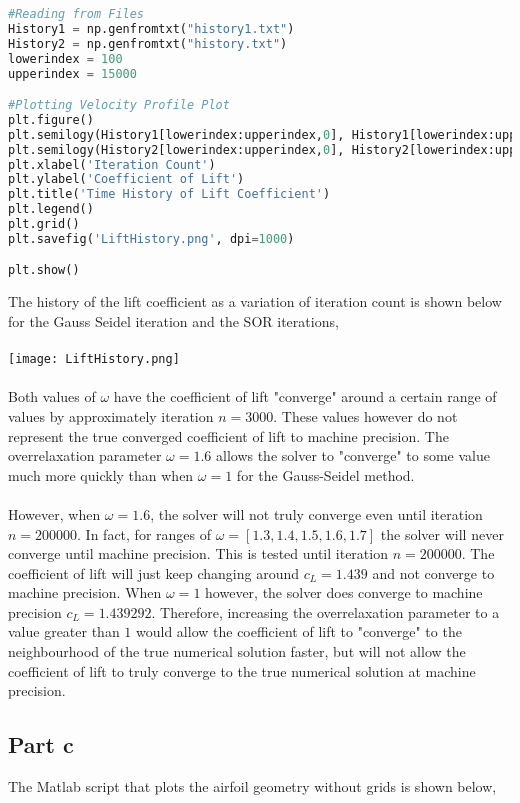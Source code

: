 \documentclass[a4paper, 12pt]{report}
\def\w{\omega}
\def\size{0.90}
\begin{document}
\begin{center}
\begin{lstlisting}[language=python]
#Reading from Files
History1 = np.genfromtxt("history1.txt")
History2 = np.genfromtxt("history.txt")
lowerindex = 100
upperindex = 15000

#Plotting Velocity Profile Plot
plt.figure()
plt.semilogy(History1[lowerindex:upperindex,0], History1[lowerindex:upperindex,1], label='w=1')
plt.semilogy(History2[lowerindex:upperindex,0], History2[lowerindex:upperindex,1], label='w=1.6')
plt.xlabel('Iteration Count')
plt.ylabel('Coefficient of Lift')
plt.title('Time History of Lift Coefficient')
plt.legend()
plt.grid()
plt.savefig('LiftHistory.png', dpi=1000)

plt.show()
\end{lstlisting}
$$$$
The history of the lift coefficient as a variation of iteration count is shown below for the Gauss Seidel iteration and the SOR iterations,
\\~\\\texttt{[image: LiftHistory.png]}
\\~\\Both values of $\w$ have the coefficient of lift "converge" around a certain range of values by approximately iteration $n=3000$. These values however do not represent the true converged coefficient of lift to machine precision. The overrelaxation parameter $\w=1.6$ allows the solver to "converge" to some value much more quickly than when $\w=1$ for the Gauss-Seidel method. 
\\~\\However, when $\w=1.6$, the solver will not truly converge even until iteration $n=200000$. In fact, for ranges of $\w = [1.3, 1.4, 1.5, 1.6, 1.7]$ the solver will never converge until machine precision. This is tested until iteration $n=200000$. The coefficient of lift will just keep changing around $c_L=1.439$ and not converge to machine precision. When $\w=1$ however, the solver does converge to machine precision $c_L = 1.439292$. Therefore, increasing the overrelaxation parameter to a value greater than $1$ would allow the coefficient of lift to "converge" to the neighbourhood of the true numerical solution faster, but will not allow the coefficient of lift to truly converge to the true numerical solution at machine precision.
\subsection{Part c}
The Matlab script that plots the airfoil geometry without grids is shown below,
\begin{lstlisting}[language=matlab]
%Author: Hans C. Suganda


\end{lstlisting}
\end{center}
\end{document}
